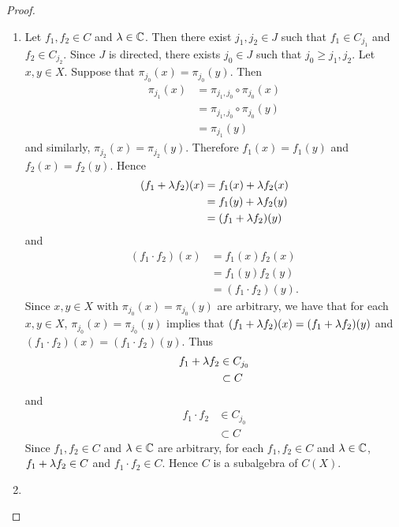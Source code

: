 \documentclass{book}
\begin{document}
\begin{proof}\
	\begin{enumerate}
		\item Let $f_1 , f_2 \in C$ and $\lambda \in \mathbb{C}$. Then there exist $j_1, j_2 \in J$ such that $f_1 \in C_{j_1}$ and $f_2 \in C_{j_2}$. Since $J$ is directed, there exists $j_0 \in J$ such that $j_0 \geq j_1, j_2$. Let $x,y \in X$. Suppose that $\pi_{j_0}(x) = \pi_{j_0}(y)$. Then 
		\begin{align*}
			\pi_{j_1}(x)
			& = \pi_{j_1, j_0} \circ \pi_{j_0}(x) \\
			& =  \pi_{j_1, j_0} \circ \pi_{j_0}(y) \\
			& = \pi_{j_1}(y)
		\end{align*}
		and similarly, $\pi_{j_2}(x) = \pi_{j_2}(y)$. Therefore $f_1(x) = f_1(y)$ and $f_{2}(x) = f_2(y)$. Hence 
		\begin{align*}
			(f_1 + \lambda f_2)(x)
			& = f_1(x) + \lambda f_2(x) \\
			& = f_1(y) + \lambda f_2(y) \\
			& = (f_1 + \lambda f_2)(y)
		\end{align*}
		and 
		\begin{align*}
			(f_1 \cdot f_2)(x)
			& = f_1(x)f_2(x) \\
			& = f_1(y)f_2(y) \\
			& = (f_1 \cdot f_2) (y).
		\end{align*}
		Since $x, y \in X$ with $\pi_{j_0}(x) = \pi_{j_0}(y)$ are arbitrary, we have that for each $x,y \in X$, $\pi_{j_0}(x) = \pi_{j_0}(y)$ implies that $(f_1 + \lambda f_2)(x) = (f_1 + \lambda f_2)(y)$ and $(f_1 \cdot f_2)(x) = (f_1 \cdot f_2)(y)$. Thus 
		\begin{align*}
			f_1 + \lambda f_2 
			& \in C_{j_0} \\
			& \subset C
		\end{align*} 
		and 
		\begin{align*}
			f_1 \cdot f_2
			& \in C_{j_0} \\
			& \subset C
		\end{align*} 
		Since $f_1 , f_2 \in C$ and $\lambda \in \mathbb{C}$ are arbitrary, for each $f_1 , f_2 \in C$ and $\lambda \in \mathbb{C}$, $f_1 + \lambda f_2 \in C$ and $f_1 \cdot f_2 \in C$. Hence $C$ is a subalgebra of $C(X)$. 
		\item 
	\end{enumerate}
\end{proof}


\end{document}
